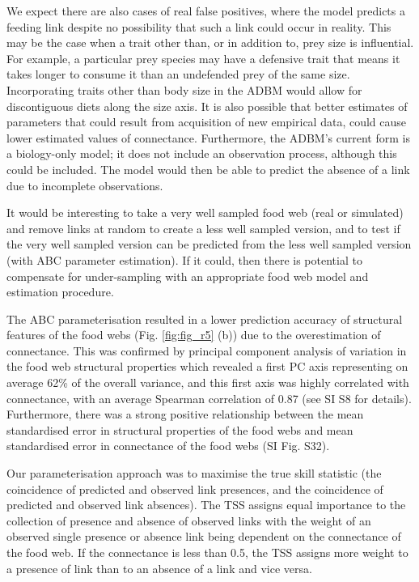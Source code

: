 \documentclass{article}
\begin{document}
We expect there are also cases of real false positives, where the model
predicts a feeding link despite no possibility that such a link could
occur in reality. This may be the case when a trait other than, or in
addition to, prey size is influential. For example, a particular prey
species may have a defensive trait that means it takes longer to consume
it than an undefended prey of the same size. Incorporating traits other
than body size in the ADBM would allow for discontiguous diets along the
size axis. It is also possible that better estimates of parameters that
could result from acquisition of new empirical data, could cause lower
estimated values of connectance. Furthermore, the ADBM's current form is
a biology-only model; it does not include an observation process,
although this could be included. The model would then be able to predict
the absence of a link due to incomplete observations.

It would be interesting to take a very well sampled food web (real or
simulated) and remove links at random to create a less well sampled
version, and to test if the very well sampled version can be predicted
from the less well sampled version (with ABC parameter estimation). If
it could, then there is potential to compensate for under-sampling with
an appropriate food web model and estimation procedure.

The ABC parameterisation resulted in a lower prediction accuracy of
structural features of the food webs (Fig. \ref{fig:fig_r5} (b)) due to
the overestimation of connectance. This was confirmed by principal
component analysis of variation in the food web structural properties
which revealed a first PC axis representing on average 62\% of the
overall variance, and this first axis was highly correlated with
connectance, with an average Spearman correlation of 0.87 (see SI S8 for
details). Furthermore, there was a strong positive relationship between
the mean standardised error in structural properties of the food webs
and mean standardised error in connectance of the food webs (SI Fig.
S32).

Our parameterisation approach was to maximise the true skill statistic
(the coincidence of predicted and observed link presences, and the
coincidence of predicted and observed link absences). The TSS assigns
equal importance to the collection of presence and absence of observed
links with the weight of an observed single presence or absence link
being dependent on the connectance of the food web. If the connectance
is less than 0.5, the TSS assigns more weight to a presence of link than
to an absence of a link and vice versa.
\end{document}
